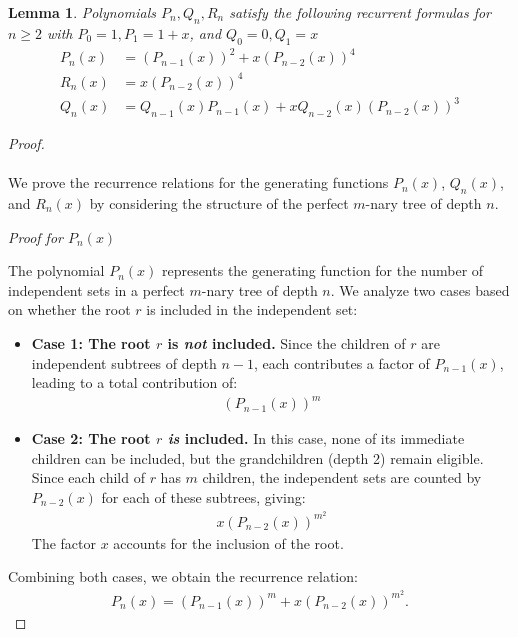 \documentclass{amsart}
\newtheorem{lemma}[theorem]{Lemma}
\theoremstyle{definition}
\begin{document}
\begin{lemma}\label{lemma:generating_def}
	Polynomials $P_n, Q_n, R_n$ satisfy the following recurrent formulas for $n\geq 2$ with $P_{0}=1, P_1=1+x$, and $Q_{0}=0, Q_1=x$
	\begin{align*}
		P_n(x) & = (P_{n - 1}(x))^2 + x(P_{n - 2}(x))^4                     \\
		R_n(x) & = x(P_{n - 2}(x))^4                                        \\
		Q_n(x) & = Q_{n - 1}(x)P_{n - 1}(x) + xQ_{n - 2}(x)(P_{n - 2}(x))^3
	\end{align*}
\end{lemma}
\begin{proof}
	$ $
	\\ \\
	We prove the recurrence relations for the generating functions $P_n(x)$, $Q_n(x)$, and $R_n(x)$ by considering the structure of the perfect $m$-nary tree of depth $n$.
	\vspace{0.5em}

	\textit{Proof for $P_n(x)$}

	The polynomial $P_n(x)$ represents the generating function for the number of independent sets in a perfect $m$-nary tree of depth $n$. We analyze two cases based on whether the root $r$ is included in the independent set:

	\begin{itemize}
	    \item \textbf{Case 1: The root $r$ is \emph{not} included.} 
	    Since the children of $r$ are independent subtrees of depth $n-1$, each contributes a factor of $P_{n-1}(x)$, leading to a total contribution of:
	    \begin{align*}
		    (P_{n - 1}(x))^m
	    \end{align*}
	    
	    \item \textbf{Case 2: The root $r$ \emph{is} included.} 
	    In this case, none of its immediate children can be included, but the grandchildren (depth 2) remain eligible. Since each child of $r$ has $m$ children, the independent sets are counted by $P_{n-2}(x)$ for each of these subtrees, giving:
	    \begin{align*}
		    x (P_{n-2}(x))^{m^2}
	    \end{align*}
	    The factor $x$ accounts for the inclusion of the root.
	\end{itemize}

	Combining both cases, we obtain the recurrence relation:
	    \begin{align*}
		P_n(x) = (P_{n-1}(x))^m + x (P_{n-2}(x))^{m^2}.
	    \end{align*}


\end{proof}
\end{document}
